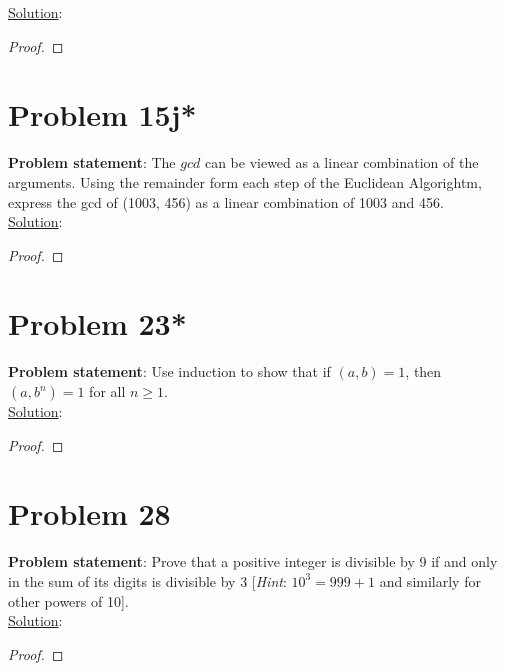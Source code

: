 \documentclass{article} %
\begin{document}
\underline{Solution}: 
\begin{addmargin}[1em]{0em}
\begin{proof}

\end{proof}
\end{addmargin}

\newpage

\section*{Problem 15j*}


\textbf{Problem statement}: The $gcd$ can be viewed as a linear combination of the arguments.  Using the remainder form each step of the Euclidean Algorightm, express the gcd of (1003, 456) as a linear combination of 1003 and 456.
\\

\underline{Solution}: 
\begin{addmargin}[1em]{0em}
\begin{proof}

\end{proof}
\end{addmargin}

\newpage

\section*{Problem 23*}


\textbf{Problem statement}: Use induction to show that if $(a,b) = 1$, then $(a,b^n) = 1$ for all $n \geq 1$.
\\

\underline{Solution}: 
\begin{addmargin}[1em]{0em}
\begin{proof}

\end{proof}
\end{addmargin}

\newpage

\section*{Problem 28}


\textbf{Problem statement}: Prove that a positive integer is divisible by 9 if and only in the sum of its digits is divisible by 3 [\textit{Hint}: $10^3 = 999 + 1$ and similarly for other powers of 10].
\\

\underline{Solution}: 
\begin{addmargin}[1em]{0em}
\begin{proof}

\end{proof}
\end{addmargin}

\end{document}
